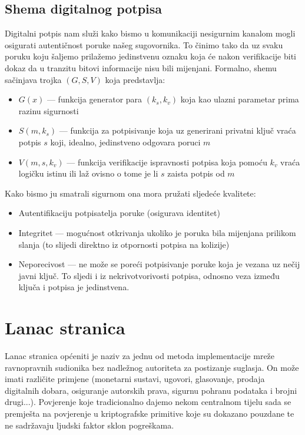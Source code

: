 \documentclass[utf8, zavrsni]{fer}
\begin{document}
\section{Shema digitalnog potpisa}
Digitalni potpis nam služi kako bismo u komunikaciji nesigurnim kanalom mogli osigurati autentičnost poruke našeg sugovornika. To činimo tako da uz svaku poruku koju šaljemo prilažemo jedinstvenu oznaku koja će nakon verifikacije biti dokaz da u tranzitu bitovi informacije nisu bili mijenjani. Formalno, shemu sačinjava trojka $(G, S, V)$ koja predstavlja:
\begin{itemize}
	\item $G(x)$ --- funkcija generator para $(k_{s}, k_{v})$ koja kao ulazni parametar prima razinu sigurnosti
	\item $S(m, k_{s})$ --- funkcija za potpisivanje koja uz generirani privatni ključ vraća potpis $s$ koji, idealno, jedinstveno odgovara poruci $m$
	\item $V(m, s, k_{v})$ --- funkcija verifikacije ispravnosti potpisa koja pomoću $k_{v}$ vraća logičku istinu ili laž ovisno o tome je li $s$ zaista potpis od $m$
\end{itemize}
Kako bismo ju smatrali sigurnom ona mora pružati sljedeće kvalitete:
\begin{itemize}
	\item Autentifikaciju potpisatelja poruke (osigurava identitet)
	\item Integritet --- mogućnost otkrivanja ukoliko je poruka bila mijenjana prilikom slanja (to slijedi direktno iz otpornosti potpisa na kolizije)
	\item Neporecivost --- ne može se poreći potpisivanje poruke koja je vezana uz nečij javni ključ. To sljedi i iz nekrivotvorivosti potpisa, odnosno veza između ključa i potpisa je jedinstvena.
\end{itemize}

\chapter{Lanac stranica}
Lanac stranica općeniti je naziv za jednu od metoda implementacije mreže ravnopravnih sudionika bez nadležnog autoriteta za postizanje suglasja. On može imati različite primjene (monetarni sustavi, ugovori, glasovanje, prodaja digitalnih dobara, osiguranje autorskih prava, sigurnu pohranu podataka i brojni drugi...). Povjerenje koje tradicionalno dajemo nekom centralnom tijelu sada se premješta na povjerenje u kriptografske primitive koje su dokazano pouzdane te ne sadržavaju ljudski faktor sklon pogreškama.
\end{document}
